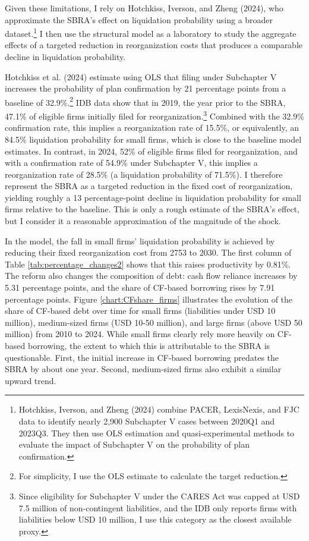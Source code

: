 \documentclass[12pt]{article}
\begin{document}
Given these limitations, I rely on Hotchkiss, Iverson, and Zheng (2024), who approximate the SBRA's effect on liquidation probability using a broader dataset.\footnote{Hotchkiss, Iverson, and Zheng (2024) combine PACER, LexisNexis, and FJC data to identify nearly 2,900 Subchapter V cases between 2020Q1 and 2023Q3. They then use OLS estimation and quasi-experimental methods to evaluate the impact of Subchapter V on the probability of plan confirmation.} I then use the structural model as a laboratory to study the aggregate effects of a targeted reduction in reorganization costs that produces a comparable decline in liquidation probability. 

Hotchkiss et al. (2024) estimate using OLS that filing under Subchapter V increases the probability of plan confirmation by 21 percentage points from a baseline of 32.9\%.\footnote{For simplicity, I use the OLS estimate to calculate the target reduction.} IDB data show that in 2019, the year prior to the SBRA, 47.1\% of eligible firms initially filed for reorganization.\footnote{Since eligibility for Subchapter V under the CARES Act was capped at USD 7.5 million of non-contingent liabilities, and the IDB only reports firms with liabilities below USD 10 million, I use this category as the closest available proxy.} Combined with the 32.9\% confirmation rate, this implies a reorganization rate of 15.5\%, or equivalently, an 84.5\% liquidation probability for small firms, which is close to the baseline model estimates. In contrast, in 2024, 52\% of eligible firms filed for reorganization, and with a confirmation rate of 54.9\% under Subchapter V, this implies a reorganization rate of 28.5\% (a liquidation probability of 71.5\%). I therefore represent the SBRA as a targeted reduction in the fixed cost of reorganization, yielding roughly a 13 percentage-point decline in liquidation probability for small firms relative to the baseline. This is only a rough estimate of the SBRA's effect, but I consider it a reasonable approximation of the magnitude of the shock.

In the model, the fall in small firms' liquidation probability is achieved by reducing their fixed reorganization cost from 2753 to 2030. The first column of Table \ref{tab:percentage_changes2} shows that this raises productivity by 0.81\%. The reform also changes the composition of debt: cash flow reliance increases by 5.31 percentage points, and the share of CF-based borrowing rises by 7.91 percentage points. Figure \ref{chart:CFshare_firms} illustrates the evolution of the share of CF-based debt over time for small firms (liabilities under USD 10 million), medium-sized firms (USD 10-50 million), and large firms (above USD 50 million) from 2010 to 2024. While small firms clearly rely more heavily on CF-based borrowing, the extent to which this is attributable to the SBRA is questionable. First, the initial increase in CF-based borrowing predates the SBRA by about one year. Second, medium-sized firms also exhibit a similar upward trend.
\end{document}
